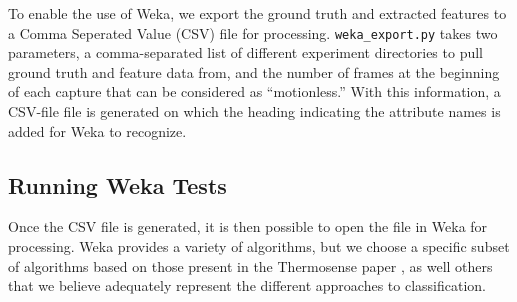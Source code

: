 \documentclass[../thesis/thesis.tex]{subfiles}
\begin{document}
To enable the use of Weka, we export the ground truth and extracted features to a Comma Seperated Value (CSV) file for processing. \texttt{weka\_export.py} takes two parameters, a comma-separated list of different experiment directories to pull ground truth and feature data from, and the number of frames at the beginning of each capture that can be considered as ``motionless.'' With this information, a CSV-file file is generated on which the heading indicating the attribute names is added for Weka to recognize.

\subsection{Running Weka Tests}
Once the CSV file is generated, it is then possible to open the file in Weka for processing. Weka provides a variety of algorithms, but we choose a specific subset of algorithms based on those present in the Thermosense paper \cite{beltran2013thermosense}, as well others that we believe adequately represent the different approaches to classification.
\end{document}
